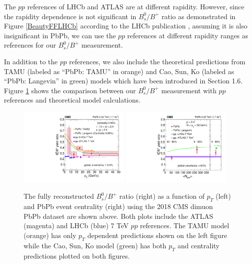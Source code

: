 The $pp$ references of LHCb and ATLAS are at different rapidity. However, since the rapidity dependence is not significant in $B^0_s/B^+$ ratio as demonstrated in Figure \ref{BeautyFFLHCb} according to the LHCb publication \cite{LHCbFF}, assuming it is also insignificant in PbPb, we can use the $pp$ references at different rapidity ranges as references for our $B^0_s/B^+$ measurement.

In addition to the $pp$ references, we also include the theoretical predictions from TAMU (labeled as ``PbPb: TAMU'' in orange) and Cao, Sun, Ko (labeled as ``PbPb: Langevin'' in green) models which have been introduced in Section 1.6. Figure \ref{FinalResults} shows the comparison between our $B^0_s/B^+$ measurement with $pp$ references and theoretical model calculations. 

\begin{figure}[hbtp]
\begin{center}
\includegraphics[width=0.48\textwidth]{Figures/Chapter6/ratio_vsPt_ref1_1.pdf}
\includegraphics[width=0.48\textwidth]{Figures/Chapter6/ratio_vsCent_ref1.pdf}
\caption{The fully reconstructed $B^0_s/B^+$ ratio (right) as a function of $p_T$ (left) and PbPb event centrality (right) using the 2018 CMS dimuon PbPb dataset are shown above. Both plots include the ATLAS (magenta) and LHCb (blue) 7 TeV $pp$ references. The TAMU model (orange) has only $p_T$ dependent predictions shown on the left figure while the Cao, Sun, Ko model (green) has both $p_T$ and centrality predictions plotted on both figures.}
\label{FinalResults}
\end{center}
\end{figure}   
 

